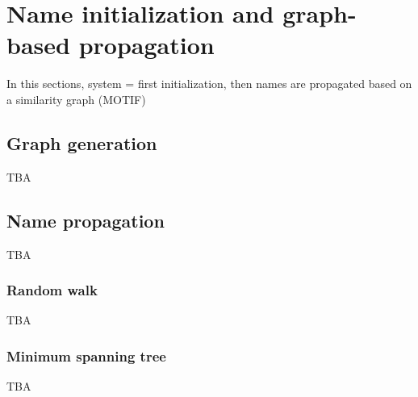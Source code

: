 \section{Name initialization and graph-based propagation}
\label{sec:graph}

In this sections, system = first initialization, then names are propagated based on a similarity graph (MOTIF)

\subsection{Graph generation}

TBA

\subsection{Name propagation}

TBA

\subsubsection{Random walk}

TBA

\subsubsection{Minimum spanning tree}

TBA

\endinput

